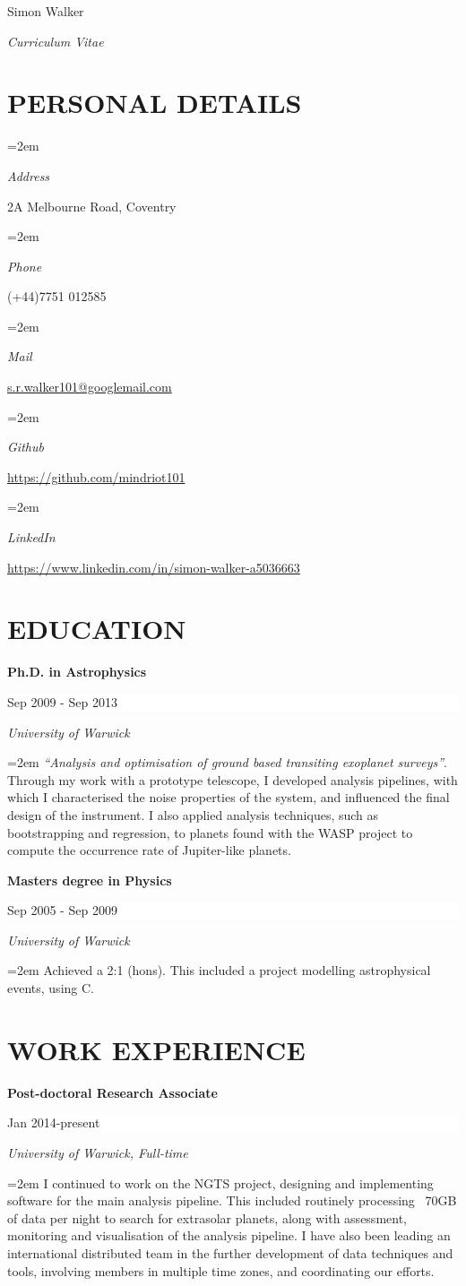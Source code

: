 \documentclass[paper=a4,fontsize=11pt]{scrartcl} %
\newlength{\spacebox}
\newcommand{\sepspace}{\vspace*{1em}}		%
\newcommand{\MyName}[1]{ %
		\Huge \usefont{OT1}{phv}{b}{n} \hfill #1
		\par \normalsize \normalfont}
\newcommand{\MySlogan}[1]{ %
		\large \usefont{OT1}{phv}{m}{n}\hfill \textit{#1}
		\par \normalsize \normalfont}
\newcommand{\NewPart}[1]{\section*{\uppercase{#1}}}
\newcommand{\PersonalEntry}[2]{
		\noindent\hangindent=2em\hangafter=0 %
		\parbox{\spacebox}{        %
		\textit{#1}}		       %
		\hspace{1.5em} #2 \par}    %
\newcommand{\EducationEntry}[4]{
		\noindent \textbf{#1} \hfill      %
		\colorbox{White}{%
			\parbox{10em}{%
			\hfill\color{Black}#2}} \par  %
		\noindent \textit{#3} \par        %
    \sepspace
		\noindent\hangindent=2em\hangafter=0 \small #4 %
		\normalsize \par}
\begin{document}

\MyName{Simon Walker}
\MySlogan{Curriculum Vitae}

\sepspace

\NewPart{Personal details}{}

\PersonalEntry{Address}{2A Melbourne Road, Coventry}
\PersonalEntry{Phone}{(+44)7751 012585}
\PersonalEntry{Mail}{\url{s.r.walker101@googlemail.com}}
\PersonalEntry{Github}{\url{https://github.com/mindriot101}}
\PersonalEntry{LinkedIn}{\url{https://www.linkedin.com/in/simon-walker-a5036663}}

\NewPart{Education}{}

\EducationEntry{Ph.D. in Astrophysics}{Sep 2009 - Sep 2013}{University of
  Warwick}{\textit{``Analysis and optimisation of ground based transiting
    exoplanet surveys''}. Through my work with a prototype telescope, I developed
  analysis pipelines, with which I characterised the noise properties of the
  system, and influenced the final design of the instrument. I also applied
  analysis techniques, such as bootstrapping and regression, to planets found
  with the WASP project to compute the occurrence rate of Jupiter-like planets.}
\sepspace

\EducationEntry{Masters degree in Physics}{Sep 2005 - Sep 2009}{University of
  Warwick}{Achieved a 2:1 (hons). This included a project modelling astrophysical
  events, using C.}

\NewPart{Work experience}{}

\EducationEntry{Post-doctoral Research Associate}{Jan 2014-present}{University
  of Warwick, Full-time}{I continued to work on the NGTS project, designing and
  implementing software for the main analysis pipeline. This included routinely
  processing ~70GB of data per night to search for extrasolar planets, along
  with assessment, monitoring and visualisation of the analysis pipeline. I have
  also been leading an international distributed team in the further development of data
  techniques and tools, involving members in multiple time zones, and
  coordinating our efforts.}
\end{document}
